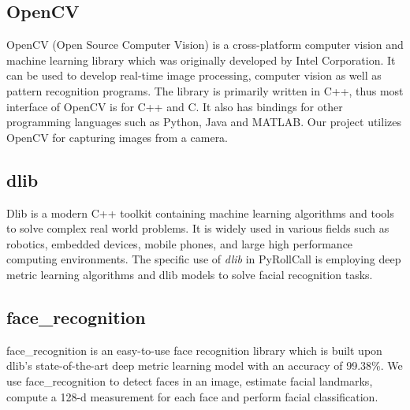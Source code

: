 
\subsection{OpenCV}  %
OpenCV (Open Source Computer Vision) is a cross-platform computer vision and machine learning library which was
originally developed by Intel Corporation. It can be used to develop real-time image processing, computer vision
as well as pattern recognition programs. The library is primarily written in C++, thus most interface of
OpenCV is for C++ and C. It also has bindings for other programming languages such as Python, Java and MATLAB.
Our project utilizes OpenCV for capturing images from a camera.

\subsection{dlib}  %
Dlib is a modern C++ toolkit containing machine learning algorithms and tools to solve complex real world problems.
It is widely used in various fields such as robotics, embedded devices, mobile phones, and large high performance
computing environments. The specific use of \emph{dlib} in PyRollCall is employing deep metric learning algorithms
and dlib models to solve facial recognition tasks.

\subsection{face\_recognition}  %
face\_recognition is an easy-to-use face recognition library which is built upon dlib's state-of-the-art
deep metric learning model with an accuracy of 99.38\%. We use face\_recognition to detect faces in an image,
estimate facial landmarks, compute a 128-d measurement for each face and perform facial classification.
